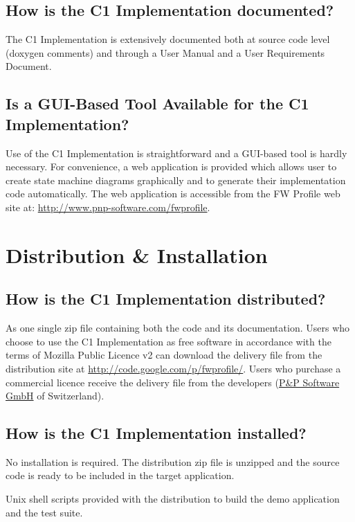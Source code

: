 \documentclass[faq]{../fwprofile}
\begin{document}
\subsection{How is the C1 Implementation documented?}
The C1 Implementation is extensively documented both at source code level (doxygen comments) and through a User Manual and a User Requirements Document.

\subsection{Is a GUI-Based Tool Available for the C1 Implementation?}
Use of the C1 Implementation is straightforward and a GUI-based tool is hardly necessary. For convenience, a web application is provided which allows user to create state machine diagrams graphically and to generate their implementation code automatically. The web application is accessible from the FW Profile web site at: \url{http://www.pnp-software.com/fwprofile}.


\section{Distribution \& Installation}

\subsection{How is the C1 Implementation distributed?}
As one single zip file containing both the code and its documentation. Users who choose to use the C1 Implementation as free software in accordance with the terms of Mozilla Public Licence v2 can download the delivery file from the distribution site at \url{http://code.google.com/p/fwprofile/}. Users who purchase a commercial licence receive the delivery file from the developers (\href{http://www.pnp-software.com/}{P\&P Software GmbH} of Switzerland).

\subsection{How is the C1 Implementation installed?}
No installation is required. The distribution zip file is unzipped and the source code is ready to be included in the target application. 

Unix shell scripts provided with the distribution to build the demo application and the test suite.
\end{document}
